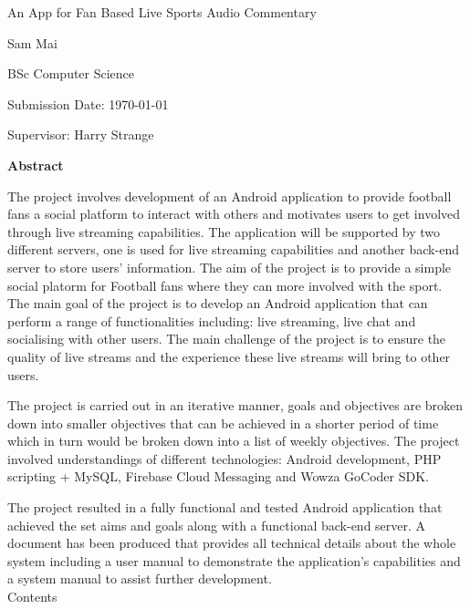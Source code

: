 \documentclass{article}
\begin{document}
\begin{center}
{\Huge An App for Fan Based Live Sports Audio Commentary\\[5cm]}

{\Large Sam Mai

BSc Computer Science

Submission Date: \today

Supervisor: Harry Strange}
\end{center}
\newpage
\begin{center}
{\Large \textbf{Abstract}}
\end{center}
The project involves development of an Android application to provide football fans a social platform to interact with others and motivates users to get involved through live streaming capabilities. The application will be supported by two different servers, one is used for live streaming capabilities and another back-end server to store users' information. The aim of the project is to provide a simple social platorm for Football fans where they can more involved with the sport. The main goal of the project is to develop an Android application that can perform a range of functionalities including: live streaming, live chat and socialising with other users. The main challenge of the project is to ensure the quality of live streams and the experience these live streams will bring to other users.\par
\noindent The project is carried out in an iterative manner, goals and objectives are broken down into smaller objectives that can be achieved in a shorter period of time which in turn would be broken down into a list of weekly objectives. The project involved understandings of different technologies: Android development, PHP scripting + MySQL, Firebase Cloud Messaging and Wowza GoCoder SDK.\par
\noindent The project resulted in a fully functional and tested Android application that achieved the set aims and goals along with a functional back-end server. A document has been produced that provides all technical details about the whole system including a user manual to demonstrate the application's capabilities and a system manual to assist further development.\\
\newpage
Contents
\end{document}
